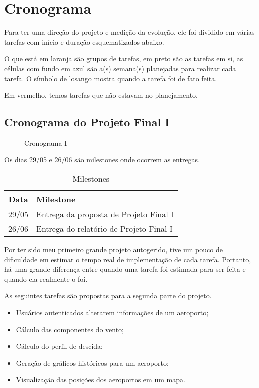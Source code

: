 \chapter{Cronograma}

Para ter uma direção do projeto e medição da evolução, ele foi dividido em várias 
tarefas com início e duração esquematizados abaixo.

O que está em laranja são grupos de tarefas, em preto são as tarefas em si, as 
células com fundo em azul são a(s) semana(s) planejadas para realizar cada tarefa. 
O símbolo de losango mostra quando a tarefa foi de fato feita.

Em vermelho, temos tarefas que não estavam no planejamento.

\section{Cronograma do Projeto Final I}

\begin{figure}[ht]
    \begin{center}
    
    \caption{Cronograma I}
    \label{fig:cronograma-planejado-I}
    \end{center}
\end{figure}

Os dias 29/05 e 26/06 são milestones onde ocorrem as entregas.

\begin{table}[h]
    \centering
    \caption{Milestones}
    \begin{tabular}{|c|l|}
        \hline
        \textbf{Data} & \textbf{Milestone} \\
        \hline
        29/05 & Entrega da proposta de Projeto Final I \\
        26/06 & Entrega do relatório de Projeto Final I \\
        \hline
    \end{tabular}
\end{table}

Por ter sido meu primeiro grande projeto autogerido, tive um pouco de dificuldade 
em estimar o tempo real de implementação de cada tarefa. Portanto, há uma grande 
diferença entre quando uma tarefa foi estimada para ser feita e quando ela realmente 
o foi.

As seguintes tarefas são propostas para a segunda parte do projeto.

\begin{itemize}
    \item Usuários autenticados alterarem informações de um aeroporto;
    \item Cálculo das componentes do vento;
    \item Cálculo do perfil de descida;
    \item Geração de gráficos históricos para um aeroporto;
    \item Visualização das posições dos aeroportos em um mapa.
\end{itemize}

